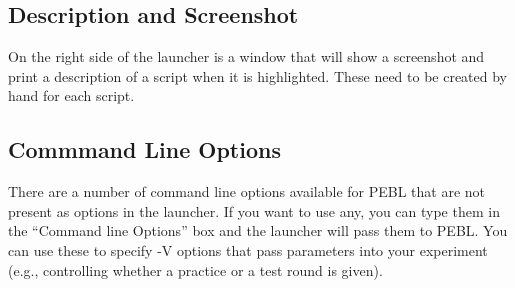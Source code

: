 \subsection{Description and Screenshot}
On the right side of the launcher is a window that will show a screenshot and print a description of a script when it is highlighted.  These need to be created by hand for each script.


\subsection{Commmand Line Options}
There are a number of command line options available for PEBL that are not present as options in the launcher.  If you want to use any, you can type them in the ``Command line Options'' box and the launcher will pass them to PEBL.  You can use these to specify -V options that pass parameters into your experiment (e.g., controlling whether a practice or a test round is given).

